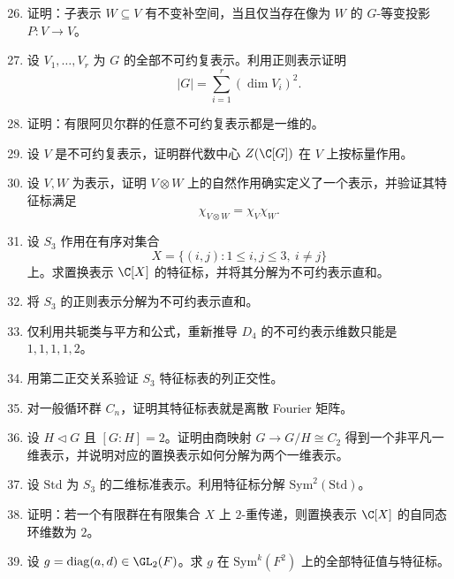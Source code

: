 \begin{enumerate}[label={\textbf{习题8.\arabic*.}}, wide=0pt, leftmargin=3.2em]
\setcounter{enumi}{25}

\item \medium 证明：子表示 $W\subseteq V$ 有不变补空间，当且仅当存在像为 $W$ 的 $G$-等变投影 $P:V\to V$。

\item \medium 设 $V_1,\dots,V_r$ 为 $G$ 的全部不可约复表示。利用正则表示证明
\[
|G|=\sum_{i=1}^r (\dim V_i)^2.
\]

\item \medium 证明：有限阿贝尔群的任意不可约复表示都是一维的。

\item \medium 设 $V$ 是不可约复表示，证明群代数中心 $Z(\C[G])$ 在 $V$ 上按标量作用。

\item \medium 设 $V,W$ 为表示，证明 $V\otimes W$ 上的自然作用确实定义了一个表示，并验证其特征标满足
\[
\chi_{V\otimes W}=\chi_V\chi_W.
\]

\item \medium 设 $S_3$ 作用在有序对集合
\[
X=\{(i,j):1\le i,j\le 3,\ i\neq j\}
\]
上。求置换表示 $\C[X]$ 的特征标，并将其分解为不可约表示直和。

\item \medium 将 $S_3$ 的正则表示分解为不可约表示直和。

\item \medium 仅利用共轭类与平方和公式，重新推导 $D_4$ 的不可约表示维数只能是 $1,1,1,1,2$。

\item \medium 用第二正交关系验证 $S_3$ 特征标表的列正交性。

\item \medium 对一般循环群 $C_n$，证明其特征标表就是离散 Fourier 矩阵。

\item \medium 设 $H\triangleleft G$ 且 $[G:H]=2$。证明由商映射 $G\to G/H\cong C_2$ 得到一个非平凡一维表示，并说明对应的置换表示如何分解为两个一维表示。

\item \medium 设 $\mathrm{Std}$ 为 $S_3$ 的二维标准表示。利用特征标分解 $\mathrm{Sym}^2(\mathrm{Std})$。

\item \medium 证明：若一个有限群在有限集合 $X$ 上 $2$-重传递，则置换表示 $\C[X]$ 的自同态环维数为 $2$。

\item \medium 设 $g=\mathrm{diag}(a,d)\in \GL_2(F)$。求 $g$ 在 $\mathrm{Sym}^k(F^2)$ 上的全部特征值与特征标。


\end{enumerate}
